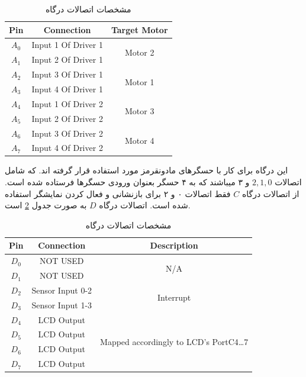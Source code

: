 \documentclass[10pt,a4paper]{article}
\newcommand{\نیمفاصله}{\halfspace}
\renewcommand{\ }{\halfspace}
\begin{document}
\begin{table}[H]
    \centering
    \begin{latin}
        \begin{tabular}{ |c|c|c| }
            \hline
            Pin &
            Connection &
            Target Motor\\
            \hline
            $A_0$ & Input 1 Of Driver 1 & \multirow{2}{*}{Motor 2}\\
            $A_1$ & Input 2 Of Driver 1 & \\
            \hline
            $A_2$ & Input 3 Of Driver 1 & \multirow{2}{*}{Motor 1}\\
            $A_3$ & Input 4 Of Driver 1 & \\
            \hline
            $A_4$ & Input 1 Of Driver 2 & \multirow{2}{*}{Motor 3}\\
            $A_5$ & Input 2 Of Driver 2 & \\
            \hline
            $A_6$ & Input 3 Of Driver 2 & \multirow{2}{*}{Motor 4}\\
            $A_7$ & Input 4 Of Driver 2 & \\
            \hline
        \end{tabular}
    \end{latin}
    \caption{مشخصات اتصالات درگاه }
    \label{table:درگاه A}
\end{table}
این درگاه برای کار با حسگرهای مادون\ قرمز مورد استفاده قرار گرفته اند. که شامل اتصالات $2, 1, 0$ و ۳ می\ باشند که به ۴ حسگر بعنوان ورودی حسگرها فرستاده شده است.
از اتصالات درگاه $C$ فقط اتصالات ۰ و ۲ برای بازنشانی و فعال کردن نمایشگر استفاده شده است.
اتصالات درگاه $D$ به صورت جدول
\ref{table:درگاه D}
است.
\vspace{-0.2em}
\begin{table}[H]
    \centering
    \begin{latin}
        \begin{tabular}{ |c|c|c| }
            \hline
            Pin &
            Connection &
            Description \\
            \hline
            $D_0$ & {\small NOT USED} & \multirow{2}{*}{N/A}\\
            $D_1$ & {\small NOT USED} & \\
            \hline
            $D_2$ & Sensor Input 0-2 & \multirow{2}{*}{Interrupt}\\
            $D_3$ & Sensor Input 1-3 & \\
            \hline
            $D_4$ & LCD Output & \multirow{4}{*}{Mapped accordingly to LCD's PortC4{\ldots}7}\\
            $D_5$ & LCD Output & \\
            $D_6$ & LCD Output & \\
            $D_7$ & LCD Output & \\
            \hline
        \end{tabular}
    \end{latin}
    \caption{مشخصات اتصالات درگاه }
    \label{table:درگاه D}
\end{table}
\end{document}
